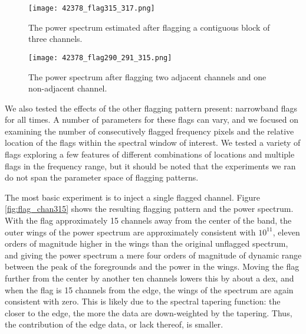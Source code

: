 \documentclass[12pt]{article}
\begin{document}
\begin{figure}[p]
	\centering
	\texttt{[image: 42378\_flag315\_317.png]}
	\caption[Power spectrum calculated with flagged time integrations and three contiguous flagged channels]{The power spectrum estimated after flagging a contiguous block of three channels.}
	\label{fig:flag_chan315_317}
\end{figure}

\begin{figure}[p]
	\centering
	\texttt{[image: 42378\_flag290\_291\_315.png]}
	\caption[Power spectrum calculated with flagged time integrations and three flagged channels (two contiguous, one not)]{The power spectrum after flagging two adjacent channels and one non-adjacent channel.}
	\label{fig:flag_chan290_291_315}
\end{figure}

We also tested the effects of the other flagging pattern present: narrowband flags for all times. A number of parameters for these flags can vary, and we focused on examining the number of consecutively flagged frequency pixels and the relative location of the flags within the spectral window of interest. We tested a variety of flags exploring a few features of different combinations of locations and multiple flags in the frequency range, but it should be noted that the experiments we ran do not span the parameter space of flagging patterns.

The most basic experiment is to inject a single flagged channel. Figure \ref{fig:flag_chan315} shows the resulting flagging pattern and the power spectrum. With the flag approximately 15 channels away from the center of the band, the outer wings of the power spectrum are approximately consistent with $10^{11}$, eleven orders of magnitude higher in the wings than the original unflagged spectrum, and giving the power spectrum a mere four orders of magnitude of dynamic range between the peak of the foregrounds and the power in the wings. Moving the flag further from the center by another ten channels lowers this by about a dex, and when the flag is 15 channels from the edge, the wings of the spectrum are again consistent with zero. This is likely due to the spectral tapering function: the closer to the edge, the more the data are down-weighted by the tapering. Thus, the contribution of the edge data, or lack thereof, is smaller.
\end{document}
